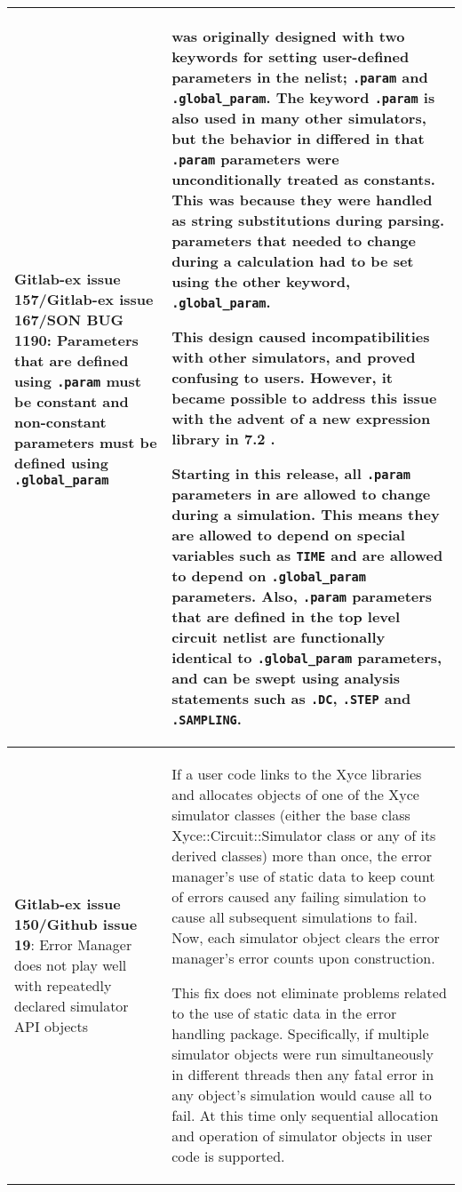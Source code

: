{\begin{longtable}[h] {>{\raggedright\small}m{2in}|>{\raggedright\let\\\tabularnewline\small}m{3.5in}}
\textbf{Gitlab-ex issue 157/Gitlab-ex issue 167/SON BUG 1190}: Parameters that are defined using \texttt{.param} must be constant and non-constant parameters must be defined using \texttt{.global\_param} & 

  \Xyce{} was originally designed with two keywords for setting 
  user-defined parameters in the nelist; \texttt{.param} and \texttt{.global\_param}.  
  The keyword \texttt{.param} is also used in many 
  other simulators, but the behavior in \Xyce{} differed in that \texttt{.param}
  parameters were unconditionally treated as constants.  This was because 
  they were handled as string substitutions during parsing.
  \Xyce{} parameters that needed to change during a calculation had to 
  be set using the other keyword, \texttt{.global\_param}.

  This design caused incompatibilities with other simulators, and 
  proved confusing to users.   However, it became possible to address 
  this issue with the advent of a new expression library in \Xyce{} 7.2 .

  Starting in this release, all \texttt{.param} parameters in \Xyce{} 
  are allowed to change during a simulation. This means they are allowed to
  depend on special variables such as \texttt{TIME} and are allowed to depend 
  on \texttt{.global\_param} parameters.  Also, \texttt{.param} parameters that are 
  defined in the top level circuit netlist are functionally identical to 
  \texttt{.global\_param} parameters, and can be swept using 
  analysis statements such as \texttt{.DC}, \texttt{.STEP} and \texttt{.SAMPLING}.
  
  \\ \hline

\textbf{Gitlab-ex issue 150/Github issue 19}: Error Manager does not play well with repeatedly declared simulator API objects &
If a user code links to the Xyce libraries and allocates objects of
one of the Xyce simulator classes (either the base class
Xyce::Circuit::Simulator class or any of its derived classes) more
than once, the error manager's use of static data to keep count of
errors caused any failing simulation to cause all subsequent
simulations to fail.  Now, each simulator object clears the error
manager's error counts upon construction.

This fix does not eliminate problems related to the use of static data
in the error handling package.  Specifically, if multiple simulator
objects were run simultaneously in different threads then any fatal
error in any object's simulation would cause all to fail.  At this
time only sequential allocation and operation of simulator objects in
user code is supported. \\ \hline


\end{longtable}}
